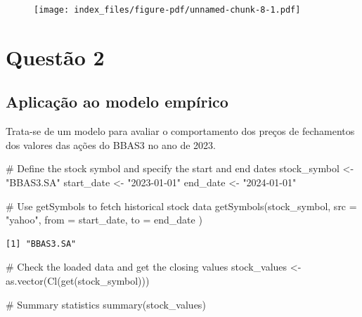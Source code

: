 \documentclass[
  letterpaper,
  DIV=11,
  numbers=noendperiod]{scrreprt}
\newenvironment{Shaded}{\begin{snugshade}}{\end{snugshade}}
\newcommand{\AttributeTok}[1]{\textcolor[rgb]{0.40,0.45,0.13}{#1}}
\newcommand{\CommentTok}[1]{\textcolor[rgb]{0.37,0.37,0.37}{#1}}
\newcommand{\FunctionTok}[1]{\textcolor[rgb]{0.28,0.35,0.67}{#1}}
\newcommand{\NormalTok}[1]{\textcolor[rgb]{0.00,0.23,0.31}{#1}}
\newcommand{\OtherTok}[1]{\textcolor[rgb]{0.00,0.23,0.31}{#1}}
\newcommand{\StringTok}[1]{\textcolor[rgb]{0.13,0.47,0.30}{#1}}
\begin{document}
\begin{figure}[H]

{\centering \texttt{[image: index\_files/figure-pdf/unnamed-chunk-8-1.pdf]}

}

\end{figure}


\hypertarget{questuxe3o-2}{%
\chapter*{Questão 2}\label{questuxe3o-2}}


\hypertarget{aplicauxe7uxe3o-ao-modelo-empuxedrico-1}{%
\section*{Aplicação ao modelo
empírico}\label{aplicauxe7uxe3o-ao-modelo-empuxedrico-1}}


Trata-se de um modelo para avaliar o comportamento dos preços de
fechamentos dos valores das ações do BBAS3 no ano de 2023.

\begin{Shaded}
\begin{Highlighting}[]
\CommentTok{\# Define the stock symbol and specify the start and end dates}
\NormalTok{stock\_symbol }\OtherTok{\textless{}{-}} \StringTok{"BBAS3.SA"}
\NormalTok{start\_date }\OtherTok{\textless{}{-}} \StringTok{"2023{-}01{-}01"}
\NormalTok{end\_date }\OtherTok{\textless{}{-}} \StringTok{"2024{-}01{-}01"}

\CommentTok{\# Use getSymbols to fetch historical stock data}
\FunctionTok{getSymbols}\NormalTok{(stock\_symbol,}
    \AttributeTok{src =} \StringTok{"yahoo"}\NormalTok{,}
    \AttributeTok{from =}\NormalTok{ start\_date,}
    \AttributeTok{to =}\NormalTok{ end\_date}
\NormalTok{)}
\end{Highlighting}
\end{Shaded}

\begin{verbatim}
[1] "BBAS3.SA"
\end{verbatim}

\begin{Shaded}
\begin{Highlighting}[]
\CommentTok{\# Check the loaded data and get the closing values}
\NormalTok{stock\_values }\OtherTok{\textless{}{-}} \FunctionTok{as.vector}\NormalTok{(}\FunctionTok{Cl}\NormalTok{(}\FunctionTok{get}\NormalTok{(stock\_symbol)))}

\CommentTok{\# Summary statistics}
\FunctionTok{summary}\NormalTok{(stock\_values)}
\end{Highlighting}
\end{Shaded}
\end{document}
